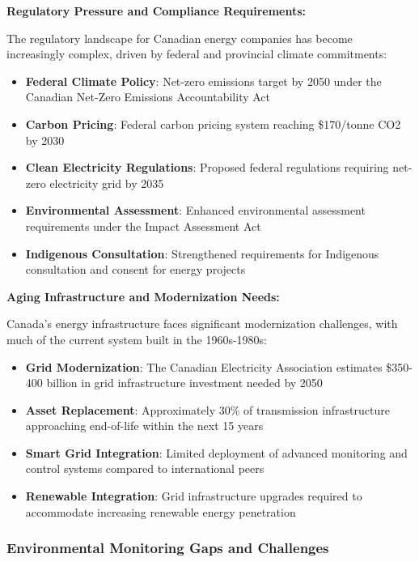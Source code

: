\textbf{Regulatory Pressure and Compliance Requirements:}

The regulatory landscape for Canadian energy companies has become increasingly complex, driven by federal and provincial climate commitments:

\begin{itemize}
    \item \textbf{Federal Climate Policy}: Net-zero emissions target by 2050 under the Canadian Net-Zero Emissions Accountability Act
    \item \textbf{Carbon Pricing}: Federal carbon pricing system reaching \$170/tonne CO2 by 2030
    \item \textbf{Clean Electricity Regulations}: Proposed federal regulations requiring net-zero electricity grid by 2035
    \item \textbf{Environmental Assessment}: Enhanced environmental assessment requirements under the Impact Assessment Act
    \item \textbf{Indigenous Consultation}: Strengthened requirements for Indigenous consultation and consent for energy projects
\end{itemize}

\textbf{Aging Infrastructure and Modernization Needs:}

Canada's energy infrastructure faces significant modernization challenges, with much of the current system built in the 1960s-1980s:

\begin{itemize}
    \item \textbf{Grid Modernization}: The Canadian Electricity Association estimates \$350-400 billion in grid infrastructure investment needed by 2050
    \item \textbf{Asset Replacement}: Approximately 30\% of transmission infrastructure approaching end-of-life within the next 15 years
    \item \textbf{Smart Grid Integration}: Limited deployment of advanced monitoring and control systems compared to international peers
    \item \textbf{Renewable Integration}: Grid infrastructure upgrades required to accommodate increasing renewable energy penetration
\end{itemize}

\subsubsection{Environmental Monitoring Gaps and Challenges}

